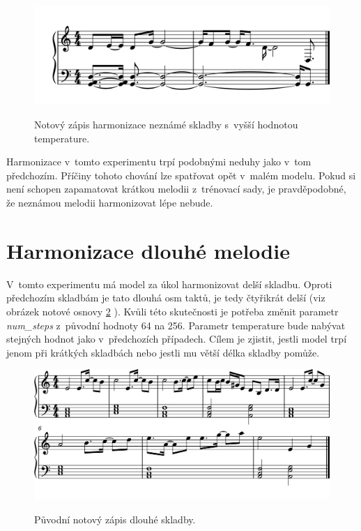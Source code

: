 \begin{figure}[h]\centering
    \centering
    \includegraphics[width=0.8\linewidth]{obrazky/MyHarmonyShortHigherTmp-1.png}\\[1pt]  
    \caption{Notový zápis harmonizace neznámé skladby s~vyšší hodnotou temperature.}    
    \label{obrazekMyHarmonyShortNotyHighTemp}
\end{figure}
\par

Harmonizace v~tomto experimentu trpí podobnými neduhy jako v~tom předchozím.
Příčiny tohoto chování lze spatřovat opět v~malém modelu.
Pokud si není schopen zapamatovat krátkou melodii z~trénovací sady,
je pravděpodobné, že neznámou melodii harmonizovat lépe nebude.

\section{Harmonizace dlouhé melodie}
V~tomto experimentu má model za úkol harmonizovat delší skladbu.
Oproti předchozím skladbám je tato dlouhá osm taktů, je tedy čtyřikrát delší
(viz obrázek notové osnovy \ref{obrazekMyHarmonyLongNoty} ).
Kvůli této skutečnosti je potřeba změnit parametr \emph{num\_steps} 
z~původní hodnoty 64 na 256.
Parametr temperature bude nabývat stejných hodnot jako v~předchozích případech.
Cílem je zjistit, jestli model trpí jenom při krátkých skladbách 
nebo jestli mu větší délka skladby pomůže.

\begin{figure}[h]\centering
    \centering
    \includegraphics[width=0.8\linewidth]{obrazky/MyMelodyLongKHarmonizaciNoty-1.png}\\[1pt]  
    \caption{Původní notový zápis dlouhé skladby.}    
    \label{obrazekMyHarmonyLongNoty}
\end{figure}
\par

